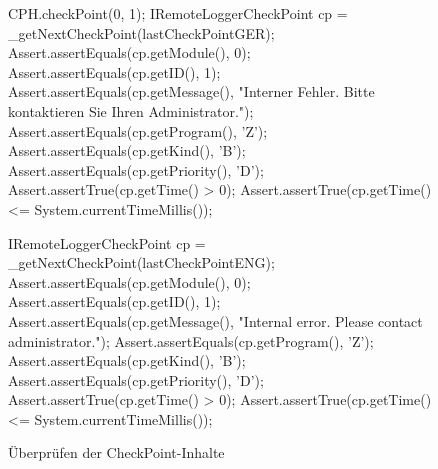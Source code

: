 \begin{figure}[htp] 
    \centering
	\begin{spacing}{0.75}
		\begin{javacode}[firstnumber=48]
CPH.checkPoint(0, 1);
IRemoteLoggerCheckPoint cp = _getNextCheckPoint(lastCheckPointGER);
Assert.assertEquals(cp.getModule(), 0);
Assert.assertEquals(cp.getID(), 1);
Assert.assertEquals(cp.getMessage(), 
  "Interner Fehler. Bitte kontaktieren Sie Ihren Administrator.");
Assert.assertEquals(cp.getProgram(), 'Z');
Assert.assertEquals(cp.getKind(), 'B');
Assert.assertEquals(cp.getPriority(), 'D');
Assert.assertTrue(cp.getTime() > 0);
Assert.assertTrue(cp.getTime() <= System.currentTimeMillis());\end{javacode}
	\end{spacing}
\end{figure}
\begin{figure}[htp] 
    \centering
	\begin{spacing}{0.75}
		\begin{javacode}[firstnumber=59]
IRemoteLoggerCheckPoint cp = _getNextCheckPoint(lastCheckPointENG);
Assert.assertEquals(cp.getModule(), 0);
Assert.assertEquals(cp.getID(), 1);
Assert.assertEquals(cp.getMessage(), "Internal error. Please contact administrator.");
Assert.assertEquals(cp.getProgram(), 'Z');
Assert.assertEquals(cp.getKind(), 'B');
Assert.assertEquals(cp.getPriority(), 'D');
Assert.assertTrue(cp.getTime() > 0);
Assert.assertTrue(cp.getTime() <= System.currentTimeMillis());\end{javacode}
	\end{spacing}
	\caption{Überprüfen der CheckPoint-Inhalte}
\end{figure}